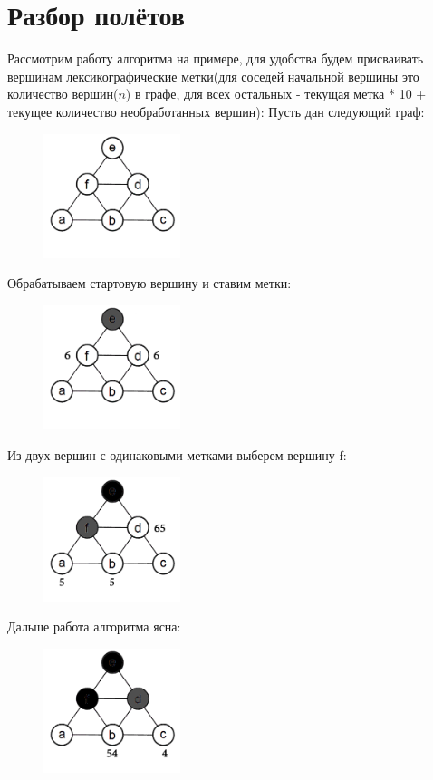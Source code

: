 \documentclass[a4paper,14pt]{article}
\begin{document}
\section{Разбор полётов}
	 Рассмотрим работу алгоритма на примере, для удобства будем присваивать вершинам лексикографические метки(для соседей начальной вершины это количество вершин($n$) в графе, для всех остальных - текущая метка * 10 + текущее количество необработанных вершин):
	\newpage Пусть дан следующий граф:
	\begin{figure}[h!]
		\centering
		\includegraphics[width=40mm]{img/1.png}
	\end{figure}
	\newline Обрабатываем стартовую вершину и ставим метки:
	\begin{figure}[h!]
		\centering
		\includegraphics[width=40mm]{img/2.png}
	\end{figure}
	\newline Из двух вершин с одинаковыми метками выберем вершину f:
	\begin{figure}[h!]
		\centering
		\includegraphics[width=40mm]{img/3.png}
	\end{figure}
	\newline Дальше работа алгоритма ясна:
	\begin{figure}[h!]
		\centering
		\includegraphics[width=40mm]{img/4.png}
	\end{figure}
\end{document}
